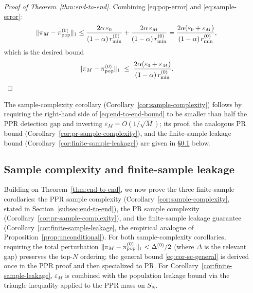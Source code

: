\documentclass{article}
\theoremstyle{plain}
\theoremstyle{definition}
\newcommand{\norm}[1]{\| #1 \|}
\begin{document}
\begin{proof}[Proof of Theorem~\ref{thm:end-to-end}]
	Combining \eqref{eq:pop-error} and \eqref{eq:sample-error}:
		\[
		\|\pi_M - \pi_{\textnormal{pop}}^{(0)}\|_1 \leq \frac{2\alpha\,\varepsilon_0}{(1-\alpha)\,r^{(0)}_{\min}} + \frac{2\alpha\,\varepsilon_M}{(1-\alpha)\,r^{(0)}_{\min}} = \frac{2\alpha(\varepsilon_0 + \varepsilon_M)}{(1-\alpha)\,r^{(0)}_{\min}},
		\]
		which is the desired bound 
			\begin{equation}\label{eq:end-to-end-bound}
			\norm{{\pi}_M - \pi_{\textnormal{pop}}^{(0)}}_1 \;\leq\; \frac{2\alpha(\varepsilon_0 + \varepsilon_M)}{(1-\alpha)\,r^{(0)}_{\min}}.
		\end{equation}
\end{proof}

The sample-complexity corollary (Corollary~\ref{cor:sample-complexity}) follows by requiring the right-hand side of \eqref{eq:end-to-end-bound} to be smaller than half the PPR detection gap and inverting $\varepsilon_M = O(1/\sqrt{M})$; its proof, the analogous PR bound (Corollary~\ref{cor:pr-sample-complexity}), and the finite-sample leakage bound (Corollary~\ref{cor:finite-sample-leakage}) are given in \S\ref{app:finite-sample} below.

\subsection{Sample complexity and finite-sample leakage}\label{app:finite-sample}

Building on Theorem~\ref{thm:end-to-end}, we now prove the three finite-sample corollaries: the PPR sample complexity (Corollary~\ref{cor:sample-complexity}, stated in Section~\ref{subsec:end-to-end}), the PR sample complexity (Corollary~\ref{cor:pr-sample-complexity}), and the finite-sample leakage guarantee (Corollary~\ref{cor:finite-sample-leakage}, the empirical analogue of Proposition~\ref{prop:unconditional}). For both sample-complexity corollaries, requiring the total perturbation $\|{\pi}_M - \pi_{\textnormal{pop}}^{(0)}\|_1 < \Delta^{(0)}/2$ (where $\Delta$ is the relevant gap) preserves the top-$N$ ordering; the general bound \eqref{eq:cor-sc-general} is derived once in the PPR proof and then specialized to PR. For Corollary~\ref{cor:finite-sample-leakage}, $\varepsilon_M$ is combined with the population leakage bound via the triangle inequality applied to the PPR mass on $S_N$.
\end{document}
